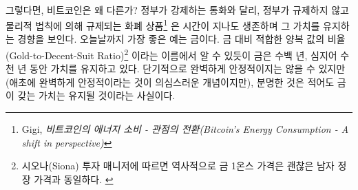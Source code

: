 
\paragraph{}
그렇다면, 비트코인은 왜 다른가? 정부가 강제하는 통화와 달리, 
정부가 규제하지 않고 물리적 법칙에 의해 규제되는 화폐 상품\footnote{Gigi, 
	\textit{비트코인의 에너지 소비 - 관점의 전환(Bitcoin's Energy Consumption - A shift in perspective)}\cite{gigi:energy}}
은 시간이 지나도 생존하며 그 가치를 유지하는 경향을 보인다. 오늘날까지 가장 좋은 예는 금이다. 
금 대비 적합한 양복 값의 비율(Gold-to-Decent-Suit Ratio)\footnote{시오나(Siona) 
	투자 매니저에 따르면 역사적으로 금 1온스 가격은 괜찮은 남자 정장 가격과 동일하다. \cite{web:gold-to-decent-suite-ratio}}
이라는 이름에서 알 수 있듯이 금은 수백 년, 심지어 수천 년 동안 가치를 유지하고 있다. 
단기적으로 완벽하게 안정적이지는 않을 수 있지만(애초에 완벽하게 안정적이라는 것이 의심스러운 개념이지만),
분명한 것은 적어도 금이 갖는 가치는 유지될 것이라는 사실이다.



